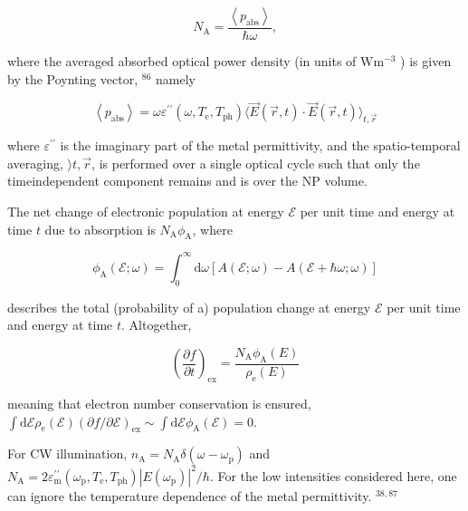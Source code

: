 \documentclass[10pt]{article}
\begin{document}
\begin{equation*}
N_{\mathrm{A}}=\frac{\left\langle p_{\mathrm{abs}}\right\rangle}{\hbar \omega}, \tag{A3}
\end{equation*}


where the averaged absorbed optical power density (in units of $\mathrm{W} \mathrm{m}^{-3}$ ) is given by the Poynting vector, ${ }^{86}$ namely


\begin{equation*}
\left\langle p_{\mathrm{abs}}\right\rangle=\omega \varepsilon^{\prime \prime}\left(\omega, T_{\mathrm{e}}, T_{\mathrm{ph}}\right)\langle\vec{E}(\vec{r}, t) \cdot \vec{E}(\vec{r}, t)\rangle_{t, \vec{r}} \tag{A4}
\end{equation*}


where $\varepsilon^{\prime \prime}$ is the imaginary part of the metal permittivity, and the spatio-temporal averaging, $\rangle t, \vec{r}$, is performed over a single optical cycle such that only the timeindependent component remains and is over the NP volume.

The net change of electronic population at energy $\mathcal{E}$ per unit time and energy at time $t$ due to absorption is $N_{\mathrm{A}} \phi_{\mathrm{A}}$, where


\begin{equation*}
\phi_{\mathrm{A}}(\mathcal{E} ; \omega)=\int_{0}^{\infty} \mathrm{d} \omega[A(\mathcal{E} ; \omega)-A(\mathcal{E}+\hbar \omega ; \omega)] \tag{A5}
\end{equation*}


describes the total (probability of a) population change at energy $\mathcal{E}$ per unit time and energy at time $t$. Altogether,


\begin{equation*}
\left(\frac{\partial f}{\partial t}\right)_{\mathrm{ex}}=\frac{N_{\mathrm{A}} \phi_{\mathrm{A}}(E)}{\rho_{\mathrm{e}}(E)} \tag{A6}
\end{equation*}


meaning that electron number conservation is ensured, $\int \mathrm{d} \mathcal{E} \rho_{\mathrm{e}}(\mathcal{E})(\partial f / \partial \mathcal{E})_{\mathrm{ex}} \sim \int \mathrm{d} \mathcal{E} \phi_{\mathrm{A}}(\mathcal{E})=0$.

For CW illumination, $n_{\mathrm{A}}=N_{\mathrm{A}} \delta\left(\omega-\omega_{\mathrm{p}}\right)$ and $N_{\mathrm{A}}=2 \varepsilon_{\mathrm{m}}^{\prime \prime}\left(\omega_{\mathrm{p}}, T_{\mathrm{e}}, T_{\mathrm{ph}}\right)\left|E\left(\omega_{\mathrm{p}}\right)\right|^{2} / \hbar$. For the low intensities considered here, one can ignore the temperature dependence of the metal permittivity. ${ }^{38,87}$
\end{document}
